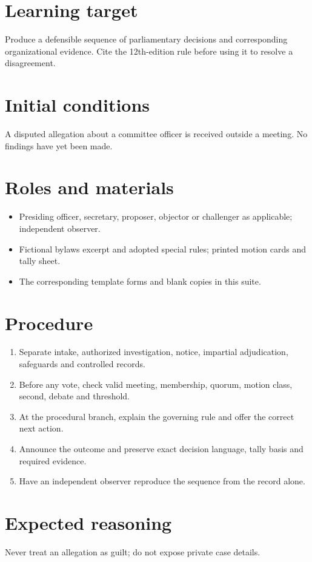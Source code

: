 \documentclass[11pt]{article}
\begin{document}
\SuiteOpen
\section{Learning target}
Produce a defensible sequence of parliamentary decisions and corresponding organizational evidence. Cite the 12th-edition rule before using it to resolve a disagreement.

\section{Initial conditions}
A disputed allegation about a committee officer is received outside a meeting. No findings have yet been made.

\section{Roles and materials}
\begin{itemize}[leftmargin=*,itemsep=4pt]
\item Presiding officer, secretary, proposer, objector or challenger as applicable; independent observer.
\item Fictional bylaws excerpt and adopted special rules; printed motion cards and tally sheet.
\item The corresponding template forms and blank copies in this suite.
\end{itemize}

\section{Procedure}
\begin{enumerate}[leftmargin=*,itemsep=4pt]
\item Separate intake, authorized investigation, notice, impartial adjudication, safeguards and controlled records.
\item Before any vote, check valid meeting, membership, quorum, motion class, second, debate and threshold.
\item At the procedural branch, explain the governing rule and offer the correct next action.
\item Announce the outcome and preserve exact decision language, tally basis and required evidence.
\item Have an independent observer reproduce the sequence from the record alone.
\end{enumerate}

\section{Expected reasoning}
Never treat an allegation as guilt; do not expose private case details.
\end{document}
